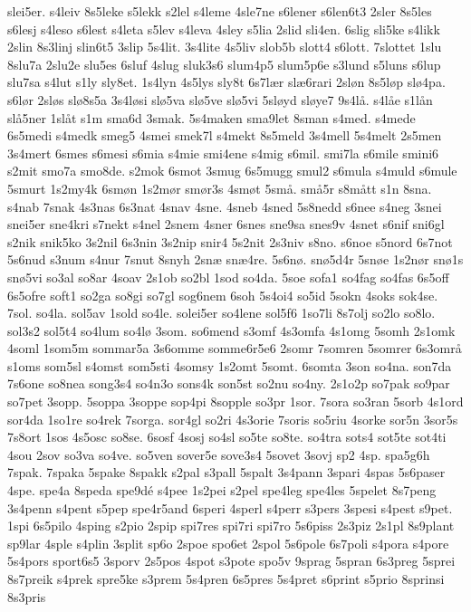 {slei5er.
s4leiv
8s5leke
s5lekk
s2lel
s4leme
4sle7ne
s6lener
s6len6t3
2sler
8s5les
s6lesj
s4leso
s6lest
s4leta
s5lev
s4leva
4sley
s5lia
2slid
sli4en.
6slig
sli5ke
s4likk
2slin
8s3linj
slin6t5
3slip
5s4lit.
3s4lite
4s5liv
slob5b
slott4
s6lott.
7slottet
1slu
8slu7a
2slu2e
slu5es
6sluf
4slug
sluk3s6
slum4p5
slum5p6e
s3lund
s5luns
s6lup
slu7sa
s4lut
s1ly
sly8et.
1s4lyn
4s5lys
sly8t
6s7lær
slæ6rari
2sløn
8s5løp
slø4pa.
s6lør
2sløs
slø8s5a
3s4løsi
slø5va
slø5ve
slø5vi
5sløyd
sløye7
9s4lå.
s4låe
s1lån
slå5ner
1slåt
s1m
sma6d
3smak.
5s4maken
sma9let
8sman
s4med.
s4mede
6s5medi
s4medk
smeg5
4smei
smek7l
s4mekt
8s5meld
3s4mell
5s4melt
2s5men
3s4mert
6smes
s6mesi
s6mia
s4mie
smi4ene
s4mig
s6mil.
smi7la
s6mile
smini6
s2mit
smo7a
smo8de.
s2mok
6smot
3smug
6s5mugg
smul2
s6mula
s4muld
s6mule
5smurt
1s2my4k
6smøn
1s2mør
smør3s
4smøt
5små.
små5r
s8mått
s1n
8sna.
s4nab
7snak
4s3nas
6s3nat
4snav
4sne.
4sneb
4sned
5s8nedd
s6nee
s4neg
3snei
snei5er
sne4kri
s7nekt
s4nel
2snem
4sner
6snes
sne9sa
snes9v
4snet
s6nif
sni6gl
s2nik
snik5ko
3s2nil
6s3nin
3s2nip
snir4
5s2nit
2s3niv
s8no.
s6noe
s5nord
6s7not
5s6nud
s3num
s4nur
7snut
8snyh
2snæ
snæ4re.
5s6nø.
snø5d4r
5snøe
1s2nør
snø1s
snø5vi
so3al
so8ar
4soav
2s1ob
so2bl
1sod
so4da.
5soe
sofa1
so4fag
so4fas
6s5off
6s5ofre
soft1
so2ga
so8gi
so7gl
sog6nem
6soh
5s4oi4
so5id
5sokn
4soks
sok4se.
7sol.
so4la.
sol5av
1sold
so4le.
solei5er
so4lene
sol5f6
1so7li
8s7olj
so2lo
so8lo.
sol3s2
sol5t4
so4lum
so4lø
3som.
so6mend
s3omf
4s3omfa
4s1omg
5somh
2s1omk
4soml
1som5m
sommar5a
3s6omme
somme6r5e6
2somr
7somren
5somrer
6s3områ
s1oms
som5sl
s4omst
som5sti
4somsy
1s2omt
5somt.
6somta
3son
so4na.
son7da
7s6one
so8nea
song3s4
so4n3o
sons4k
son5st
so2nu
so4ny.
2s1o2p
so7pak
so9par
so7pet
3sopp.
5soppa
3soppe
sop4pi
8sopple
so3pr
1sor.
7sora
so3ran
5sorb
4s1ord
sor4da
1so1re
so4rek
7sorga.
sor4gl
so2ri
4s3orie
7soris
so5riu
4sorke
sor5n
3sor5s
7s8ort
1sos
4s5osc
so8se.
6sosf
4sosj
so4sl
so5te
so8te.
so4tra
sots4
sot5te
sot4ti
4sou
2sov
so3va
so4ve.
so5ven
sover5e
sove3s4
5sovet
3sovj
sp2
4sp.
spa5g6h
7spak.
7spaka
5spake
8spakk
s2pal
s3pall
5spalt
3s4pann
3spari
4spas
5s6paser
4spe.
spe4a
8speda
spe9dé
s4pee
1s2pei
s2pel
spe4leg
spe4les
5spelet
8s7peng
3s4penn
s4pent
s5pep
spe4r5and
6speri
4sperl
s4perr
s3pers
3spesi
s4pest
s9pet.
1spi
6s5pilo
4sping
s2pio
2spip
spi7res
spi7ri
spi7ro
5s6piss
2s3piz
2s1pl
8s9plant
sp9lar
4sple
s4plin
3split
sp6o
2spoe
spo6et
2spol
5s6pole
6s7poli
s4pora
s4pore
5s4pors
sport6s5
3sporv
2s5pos
4spot
s3pote
spo5v
9sprag
5spran
6s3preg
5sprei
8s7preik
s4prek
spre5ke
s3prem
5s4pren
6s5pres
5s4pret
s6print
s5prio
8sprinsi
8s3pris
}
